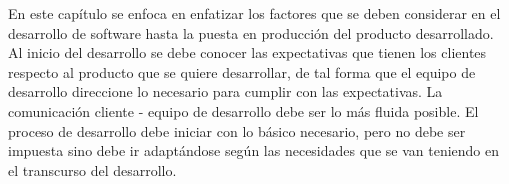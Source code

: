 \noindent En este capítulo se enfoca en enfatizar los factores que se deben considerar en el desarrollo de software hasta la puesta en producción del producto desarrollado. Al inicio del desarrollo se debe conocer las expectativas que tienen los clientes respecto al producto que se quiere desarrollar, de tal forma que el equipo de desarrollo direccione lo necesario para cumplir con las expectativas. La comunicación cliente - equipo de desarrollo debe ser lo más fluida posible.
\noindent El proceso de desarrollo debe iniciar con lo básico necesario, pero no debe ser impuesta sino debe ir adaptándose según las necesidades que se van teniendo en el transcurso del desarrollo. 